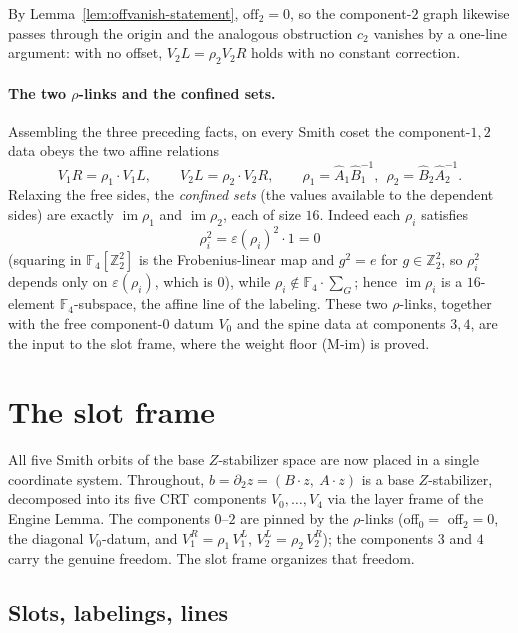 \documentclass[11pt]{article}
\newcommand{\Z}{\mathbb{Z}}
\newcommand{\F}[1]{\mathbb{F}_{#1}}
\DeclareMathOperator{\img}{im}
\newcommand{\aug}{\varepsilon}
\newcommand{\hA}{\hat{A}}
\newcommand{\hB}{\hat{B}}
\theoremstyle{plain}
\theoremstyle{definition}
\theoremstyle{remark}
\begin{document}
By Lemma~\ref{lem:offvanish-statement}, $\mathrm{off}_2=0$, so the component-$2$
graph likewise passes through the origin and the analogous obstruction $c_2$
vanishes by a one-line argument: with no offset, $V_2L=\rho_2 V_2R$ holds with no
constant correction.

\paragraph{The two $\rho$-links and the confined sets.}
Assembling the three preceding facts, on every Smith coset the component-$1,2$ data
obeys the two affine relations
\[
  V_1R=\rho_1\cdot V_1L,\qquad V_2L=\rho_2\cdot V_2R,
  \qquad \rho_1=\hA_1\hB_1^{-1},\ \ \rho_2=\hB_2\hA_2^{-1}.
\]
Relaxing the free sides, the \emph{confined sets} (the values available to the
dependent sides) are exactly $\img\rho_1$ and $\img\rho_2$, each of size $16$.
Indeed each $\rho_i$ satisfies
\[
  \rho_i^2=\aug(\rho_i)^2\cdot 1=0
\]
(squaring in $\F4[\Z_2^2]$ is the Frobenius-linear map and $g^2=e$ for
$g\in\Z_2^2$, so $\rho_i^2$ depends only on $\aug(\rho_i)$, which is $0$), while
$\rho_i\notin\F4\cdot\textstyle\sum_G$; hence $\img\rho_i$ is a $16$-element
$\F4$-subspace, the affine line of the labeling. These two $\rho$-links, together
with the free component-$0$ datum $V_0$ and the spine data at components $3,4$, are
the input to the slot frame, where the weight floor (M-im) is proved.
\section{The slot frame}\label{sec:slotframe}

All five Smith orbits of the base $Z$-stabilizer space are now placed in a
single coordinate system. Throughout, $b=\partial_2 z=(B\cdot z,\ A\cdot z)$ is a
base $Z$-stabilizer, decomposed into its five CRT components $V_0,\dots,V_4$ via
the layer frame of the Engine Lemma. The components $0$--$2$ are pinned by the
$\rho$-links (off${}_0=$ off${}_2=0$, the diagonal $V_0$-datum, and
$V_1^R=\rho_1\,V_1^L$, $V_2^L=\rho_2\,V_2^R$); the components $3$ and $4$ carry
the genuine freedom. The slot frame organizes that freedom.

\subsection{Slots, labelings, lines}
\end{document}
